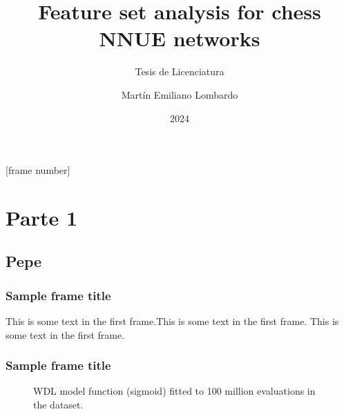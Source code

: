 \usepackage{../common}

\title{Feature set analysis for chess NNUE networks}
\subtitle{Tesis de Licenciatura}
\author{Martín Emiliano Lombardo}
\date{2024}

[frame number]{}



\frame{\titlepage}

\section{Parte 1}

\subsection{Pepe}

\begin{frame}
\frametitle{Sample frame title}
This is some text in the first frame.\pause This is some text in the first frame. This is some text in the first frame.
\end{frame}

\begin{frame}
\frametitle{Sample frame title}

\begin{figure}[H]
\centering
{}
\caption{WDL model function (sigmoid) fitted to 100 million evaluations in the dataset.}
\label{wdl-fit}
\end{figure}

\end{frame}


